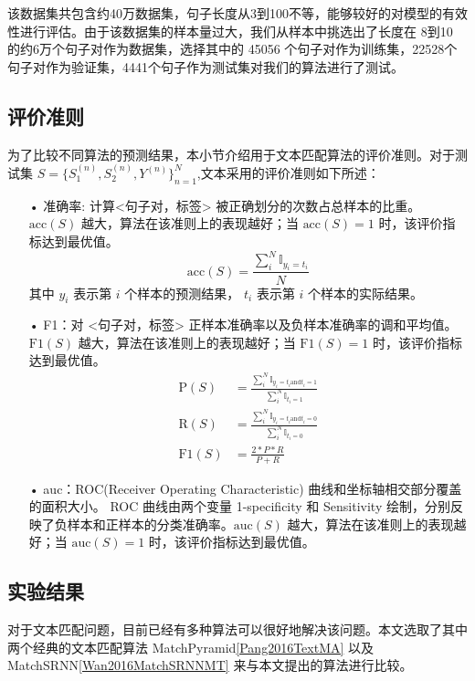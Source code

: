 该数据集共包含约40万数据集，句子长度从3到100不等，能够较好的对模型的有效性进行评估。由于该数据集的样本量过大，我们从样本中挑选出了长度在 8到10 的约6万个句子对作为数据集，选择其中的 45056 个句子对作为训练集，22528个句子对作为验证集，4441个句子作为测试集对我们的算法进行了测试。

\subsection{评价准则}
为了比较不同算法的预测结果，本小节介绍用于文本匹配算法的评价准则。对于测试集 $S = \{S_1^{(n)}, S_2^{(n)}, Y^{(n)}\}_{n=1}^N$,文本采用的评价准则如下所述：

\begin{itemize}
  \item[•] 准确率: 计算<句子对，标签> 被正确划分的次数占总样本的比重。 $\text{acc}(S)$ 越大，算法在该准则上的表现越好；当 $\text{acc}(S) = 1$ 时，该评价指标达到最优值。
  $$
  \text{acc}(S) = \frac{\sum_i^N\mathbb{I}_{y_i=t_i}}{N}
  $$
  其中 $y_i$ 表示第 $i$ 个样本的预测结果， $t_i$ 表示第 $i$ 个样本的实际结果。
  \item[•] F1：对 <句子对，标签> 正样本准确率以及负样本准确率的调和平均值。 $\text{F1}(S)$ 越大，算法在该准则上的表现越好；当 $\text{F1}(S) = 1$ 时，该评价指标达到最优值。
  $$
  \begin{aligned}
  \text{P}(S) &= \frac{\sum_i^N\mathbb{I}_{y_i=t_i \text{and} t_i = 1}}{\sum_i^N\mathbb{I}_{t_i = 1}}\\
  \text{R}(S) &= \frac{\sum_i^N\mathbb{I}_{y_i=t_i \text{and} t_i = 0}}{\sum_i^N\mathbb{I}_{t_i = 0}}\\
  \text{F1}(S) &= \frac{2*P*R}{P+R}
  \end{aligned}
  $$
  \item[•] auc：ROC(Receiver Operating Characteristic) 曲线和坐标轴相交部分覆盖的面积大小。 ROC 曲线由两个变量 1-specificity 和 Sensitivity 绘制，分别反映了负样本和正样本的分类准确率。$\text{auc}(S)$ 越大，算法在该准则上的表现越好；当 $\text{auc}(S) = 1$ 时，该评价指标达到最优值。
\end{itemize}

\subsection{实验结果}
\label{sec:lab_value}
对于文本匹配问题，目前已经有多种算法可以很好地解决该问题。本文选取了其中两个经典的文本匹配算法 MatchPyramid\ref{Pang2016TextMA} 以及 MatchSRNN\ref{Wan2016MatchSRNNMT} 来与本文提出的算法进行比较。

